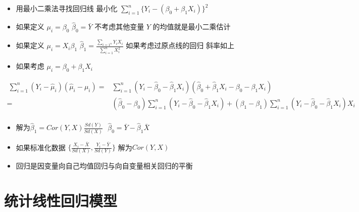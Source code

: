 \documentclass[]{book}
\providecommand{\tightlist}{%
  \setlength{\itemsep}{0pt}\setlength{\parskip}{0pt}}
\begin{document}
\begin{itemize}
\tightlist
\item
  用最小二乘法寻找回归线 最小化 \(\sum_{i=1}^n \{Y_i - (\beta_0 + \beta_1 X_i)\}^2\)
\item
  如果定义 \(\mu_i = \beta_0\) \(\hat \beta_0 = \bar Y\) 不考虑其他变量 \(Y\) 的均值就是最小二乘估计
\item
  如果定义 \(\mu_i = X_i \beta_1\) \(\hat \beta_1 = \frac{\sum_{i=1^n} Y_i X_i}{\sum_{i=1}^n X_i^2}\) 如果考虑过原点线的回归 斜率如上
\item
  如果考虑 \(\mu_i = \beta_0 + \beta_1 X_i\)
\end{itemize}

\begin{align} \
\sum_{i=1}^n (Y_i - \hat \mu_i) (\hat \mu_i - \mu_i) 
= & \sum_{i=1}^n (Y_i - \hat\beta_0 - \hat\beta_1 X_i) (\hat \beta_0 + \hat \beta_1 X_i - \beta_0 - \beta_1 X_i) \\
= & (\hat \beta_0 - \beta_0) \sum_{i=1}^n (Y_i - \hat\beta_0 - \hat \beta_1 X_i) + (\beta_1 - \beta_1)\sum_{i=1}^n (Y_i - \hat\beta_0 - \hat \beta_1 X_i)X_i\\
\end{align}

\begin{itemize}
\tightlist
\item
  解为\(\hat \beta_1 = Cor(Y, X) \frac{Sd(Y)}{Sd(X)} ~~~ \hat \beta_0 = \bar Y - \hat \beta_1 \bar X\)
\item
  如果标准化数据 \(\{ \frac{X_i - \bar X}{Sd(X)}, \frac{Y_i - \bar Y}{Sd(Y)}\}\) 解为\(Cor(Y, X)\)
\item
  回归是因变量向自己均值回归与向自变量相关回归的平衡
\end{itemize}

\hypertarget{ux7edfux8ba1ux7ebfux6027ux56deux5f52ux6a21ux578b}{%
\section{统计线性回归模型}\label{ux7edfux8ba1ux7ebfux6027ux56deux5f52ux6a21ux578b}}
\end{document}
